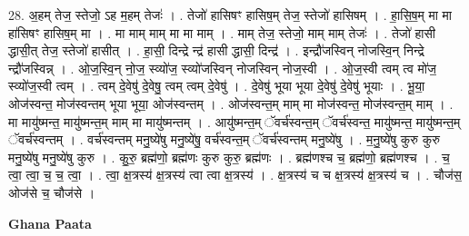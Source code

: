\documentclass[17pt]{extarticle}
\begin{document}
28. अ॒हम् तेज॒ स्तेजो॒ ऽह म॒हम् तेजः॑ । . तेजो॑ हासिषꣳ हासिष॒म् तेज॒ स्तेजो॑ हासिषम् । . हा॒सि॒ष॒म् मा मा हा॑सिषꣳ हासिष॒म् मा । . मा माम् माम् मा मा माम् । . माम् तेज॒ स्तेजो॒ माम् माम् तेजः॑ । . तेजो॑ हासी द्धासी॒त् तेज॒ स्तेजो॑ हासीत् । . हा॒सी॒ दिन्द्रे न्द्र॑ हासी द्धासी॒ दिन्द्र॑ । . इन्द्रौ॑जस्विन् नोजस्वि॒न् निन्द्रे न्द्रौ॑जस्विन्न् । . ओ॒ज॒स्वि॒न् नो॒ज॒ स्व्यो॑ज॒ स्व्यो॑जस्विन् नोजस्विन् नोज॒स्वी । . ओ॒ज॒स्वी त्वम् त्व मो॑ज॒ स्व्यो॑ज॒स्वी त्वम् । . त्वम् दे॒वेषु॑ दे॒वेषु॒ त्वम् त्वम् दे॒वेषु॑ । . दे॒वेषु॑ भूया भूया दे॒वेषु॑ दे॒वेषु॑ भूयाः । . भू॒या॒ ओज॑स्वन्त॒ मोज॑स्वन्तम् भूया भूया॒ ओज॑स्वन्तम् । . ओज॑स्वन्त॒म् माम् मा मोज॑स्वन्त॒ मोज॑स्वन्त॒म् माम् । . मा मायु॑ष्मन्त॒ मायु॑ष्मन्त॒म् माम् मा मायु॑ष्मन्तम् । . आयु॑ष्मन्त॒म् ॅवर्च॑स्वन्त॒म् ॅवर्च॑स्वन्त॒ मायु॑ष्मन्त॒ मायु॑ष्मन्त॒म् ॅवर्च॑स्वन्तम् । . वर्च॑स्वन्तम् मनु॒ष्ये॑षु मनु॒ष्ये॑षु॒ वर्च॑स्वन्त॒म् ॅवर्च॑स्वन्तम् मनु॒ष्ये॑षु । . म॒नु॒ष्ये॑षु कुरु कुरु मनु॒ष्ये॑षु मनु॒ष्ये॑षु कुरु । . कु॒रु॒ ब्रह्म॑णो॒ ब्रह्म॑णः कुरु कुरु॒ ब्रह्म॑णः । . ब्रह्म॑णश्च च॒ ब्रह्म॑णो॒ ब्रह्म॑णश्च । . च॒ त्वा॒ त्वा॒ च॒ च॒ त्वा॒ । . त्वा॒ क्ष॒त्रस्य॑ क्ष॒त्रस्य॑ त्वा त्वा क्ष॒त्रस्य॑ । . क्ष॒त्रस्य॑ च च क्ष॒त्रस्य॑ क्ष॒त्रस्य॑ च । . चौज॑स॒ ओज॑से च॒ चौज॑से । \newline

\textbf{Ghana Paata } \newline
\end{document}
